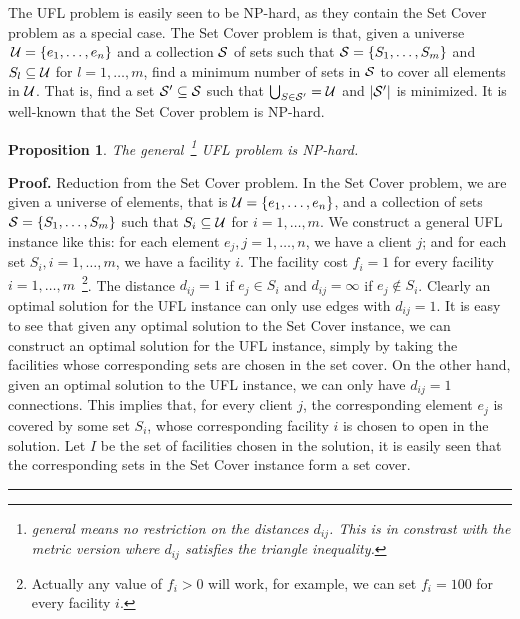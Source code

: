 \documentclass[oneside,final]{ucr}
\newtheorem{proposition}[theorem]{Proposition}
\newenvironment{proof}[1][Proof]{\textbf{#1.} }{\ \rule{0.5em}{0.5em}}
\begin{document}
The UFL problem is easily seen to be NP-hard, as they
contain the Set Cover problem as a special case. The Set
Cover problem is that, given a universe $\,\calU = \{e_1,
\ldots, e_n\}$ and a collection $\calS$ of sets such that
$\calS = \{S_1, \ldots, S_m\}$ and $S_l \subseteq \calU$ for
$l=1,\ldots,m$, find a minimum number of sets in $\calS$ to
cover all elements in $\calU$. That is, find a set $\calS'
\subseteq \calS$ such that $\bigcup_{S\in \calS'} = \calU$
and $|\calS'|$ is minimized. It is well-known that the
Set Cover problem is NP-hard.

\begin{proposition}\label{prop:UFLNP}
  The general~\footnote{\emph{general} means no restriction
    on the distances $d_{ij}$. This is in constrast with the
    \emph{metric} version where $d_{ij}$ satisfies the
    triangle inequality.} UFL problem is NP-hard.
\end{proposition}
\begin{proof}
  Reduction from the Set Cover problem. In the Set Cover
  problem, we are given a universe of elements, that is
  $\calU = \{e_1, \ldots, e_n\}$, and a collection of sets
  $\calS = \{S_1, \ldots, S_m\}$ such that $S_i \subseteq
  \calU$ for $i=1,\ldots,m$. We construct a general UFL
  instance like this: for each element $e_j, j=1,\ldots,n$,
  we have a client $j$; and for each set $S_i,
  i=1,\ldots,m$, we have a facility $i$. The facility cost
  $f_i=1$ for every facility
  $i=1,\ldots,m$~\footnote{Actually any value of $f_i > 0$
    will work, for example, we can set $f_i=100$ for every
    facility $i$.}. The distance $d_{ij} = 1$ if $e_j \in
  S_i$ and $d_{ij} = \infty$ if $e_j \notin S_i$. Clearly an
  optimal solution for the UFL instance can only use edges
  with $d_{ij} = 1$. It is easy to see that given any
  optimal solution to the Set Cover instance, we can
  construct an optimal solution for the UFL instance, simply
  by taking the facilities whose corresponding sets are
  chosen in the set cover. On the other hand, given an
  optimal solution to the UFL instance, we can only have
  $d_{ij}=1$ connections. This implies that, for every
  client $j$, the corresponding element $e_j$ is covered by
  some set $S_i$, whose corresponding facility $i$ is chosen
  to open in the {\UFL} solution. Let $I$ be the set of
  facilities chosen in the {\UFL} solution, it is easily
  seen that the corresponding sets in the Set Cover instance
  form a set cover.
\end{proof}
\end{document}
